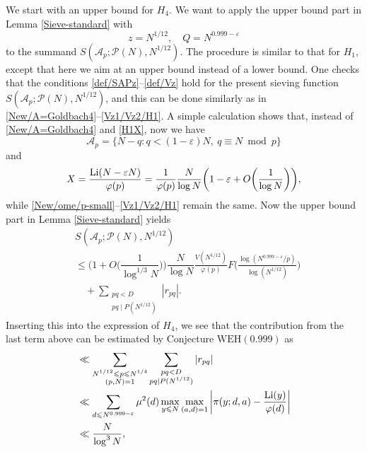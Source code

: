 \documentclass[12pt, a4paper]{amsart}
\def\Li{\hbox{{\rm Li}}}
\def\le{\leqslant}
\theoremstyle{plain}
\theoremstyle{remark}
\numberwithin{equation}{section}
\begin{document}
We start with an upper bound for $H_4$. We want to apply the upper bound part
in Lemma \ref{Sieve-standard} with
\[
z=N^{1/12},\quad Q=N^{0.999-\varepsilon}
\]
to the summand $S(\mathscr{A}_{p};\mathscr{P}(N), N^{1/12})$. The procedure is
similar to that for $H_1$, except that here we aim at an upper bound instead of a lower bound.
One checks that the conditions \eqref{def/SAPz}--\eqref{def/Vz} hold for the present sieving function
$S(\mathscr{A}_{p};\mathscr{P}(N), N^{1/12})$, and this can be done similarly as in
\eqref{New/A=Goldbach4}--\eqref{Vz1/Vz2/H1}. A simple calculation shows that,
instead of \eqref{New/A=Goldbach4} and \eqref{H1X}, now we have
\begin{equation}\label{New/A=/H4}
\mathscr{A}_p=\{N-q: q<(1-\varepsilon)N, \ q\equiv N \bmod{p}\}
\end{equation}
and
\begin{equation}\label{H1X/H4}
X=\frac{\Li(N-\varepsilon N)}{\varphi(p)}= \frac{1}{\varphi(p)} \frac{N}{\log N} \bigg(1-\varepsilon+O\bigg(\dfrac{1}{\log N}\bigg)\bigg),
\end{equation}
while \eqref{New/ome/p-small}--\eqref{Vz1/Vz2/H1} remain the same. Now the upper bound part
in Lemma \ref{Sieve-standard} yields
\begin{equation}
\begin{split}
& S(\mathscr{A}_{p};\mathscr{P}(N), N^{1/12}) \\ 
& \le 
\bigg(1+O\bigg(\dfrac{1}{\log^{1/3}N}\bigg)\bigg)\dfrac{N}{\log N}
\frac{V(N^{1/12})}{\varphi(p)} F\bigg(\frac{\log (N^{0.999-\varepsilon} / p)}{\log (N^{1/12})}\bigg) \\
&\quad  + \sum_{\substack{pq < D \\ pq \mid P(N^{1/12})}} |r_{pq}|.
\end{split}
\end{equation}
Inserting this into the expression of $H_4$, we see that the contribution from the last term above
can be estimated by Conjecture $\mathrm{WEH}(0.999)$ as
\begin{equation}
\begin{split}
&\ll \sum_{\substack{N^{1/12}\le p\le N^{1/4}\\(p, N)=1}} \sum_{\substack{pq < D \\ pq \mid P(N^{1/12})}} |r_{pq}|\\
&\ll \sum_{d\le N^{0.999-\varepsilon}} \mu^{2}(d) \max_{y\le N} \max_{(a,d)=1} \bigg|\pi(y; d, a) - \frac{\Li(y)}{\varphi(d)}\bigg| \\
&\ll \frac{N}{\log^3 N},
\end{split}
\end{equation}
\end{document}
